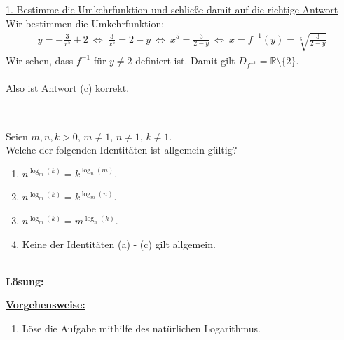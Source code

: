 \underline{1. Bestimme die Umkehrfunktion und schließe damit auf die richtige Antwort}\\
Wir bestimmen die Umkehrfunktion:
\begin{align*}
y = - \frac{3}{x^5} +2
\ \Leftrightarrow \
\frac{3}{x^5} = 2 - y
\ \Leftrightarrow \
x^5 = \frac{3}{2 -y}
\ \Leftrightarrow \
x = f^{-1}(y) = \sqrt[5]{\frac{3}{2 -y}}
\end{align*}
Wir sehen, dass $ f^{-1}  $ für $ y \neq 2 $ definiert ist.
Damit gilt $ D_{f^{-1}} = \mathbb{R} \setminus \{ 2 \} $.\\
\\
Also ist Antwort (c) korrekt.\\
\\

\newpage

\subsection*{}
Seien $ m,n,k > 0 $, $ m \neq 1 $, $ n \neq 1 $, $ k \neq 1 $.\\
Welche der folgenden Identitäten ist allgemein gültig?
\renewcommand{\labelenumi}{(\alph{enumi})}
\begin{enumerate}
	\item 
	$ n^{\log_m(k)} = k^{\log_n(m)} $.
	\item
	$ n^{\log_m(k)} = k^{\log_m(n)}$.
	\item
	$ n^{\log_m(k)} = m^{\log_n(k)}$.
	\item
	Keine der Identitäten (a) - (c) gilt allgemein.
\end{enumerate}
\ \\
\textbf{Lösung:}
\begin{mdframed}
\underline{\textbf{Vorgehensweise:}}
\renewcommand{\labelenumi}{\theenumi.}
\begin{enumerate}
\item Löse die Aufgabe mithilfe des natürlichen Logarithmus.
\end{enumerate}
\end{mdframed}

